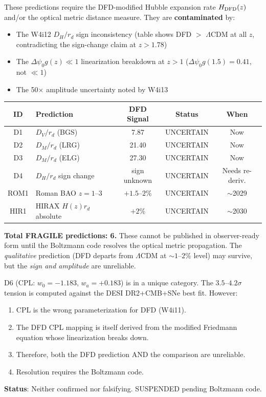 \documentclass[11pt,a4paper]{article}
\newcommand{\LCDM}{$\Lambda$CDM}
\begin{document}
\begin{fragbox}

These predictions require the DFD-modified Hubble expansion rate
$H_{\rm DFD}(z)$ and/or the optical metric distance measure. They are
\textbf{contaminated} by:
\begin{itemize}[nosep]
\item The W4i12 $D_H/r_d$ sign inconsistency (table shows DFD $>$ \LCDM{}
  at all $z$, contradicting the sign-change claim at $z > 1.78$)
\item The $\Delta\psi_0 g(z) \ll 1$ linearization breakdown at $z > 1$
  ($\Delta\psi_0 g(1.5) = 0.41$, not $\ll 1$)
\item The 50$\times$ amplitude uncertainty noted by W4i13
\end{itemize}

\begin{center}
\begin{tabular}{clccc}
\toprule
\textbf{ID} & \textbf{Prediction} & \textbf{DFD Signal}
& \textbf{Status} & \textbf{When} \\
\midrule
D1 & $D_V/r_d$ (BGS) & 7.87 & UNCERTAIN & Now \\
D2 & $D_M/r_d$ (LRG) & 21.40 & UNCERTAIN & Now \\
D3 & $D_M/r_d$ (ELG) & 27.30 & UNCERTAIN & Now \\
D4 & $D_H/r_d$ sign change & sign unknown & UNCERTAIN & Needs re-deriv. \\
ROM1 & Roman BAO $z = 1$--3 & $+1.5$--$2\%$ & UNCERTAIN & $\sim$2029 \\
HIR1 & HIRAX $H(z)r_d$ absolute & $+2\%$ & UNCERTAIN & $\sim$2030 \\
\bottomrule
\end{tabular}
\end{center}

\textbf{Total FRAGILE predictions: 6.} These cannot be published in
observer-ready form until the Boltzmann code resolves the optical metric
propagation. The \emph{qualitative} prediction (DFD departs from \LCDM{}
at $\sim 1$--$2\%$ level) may survive, but the \emph{sign and amplitude}
are unreliable.
\end{fragbox}

\begin{tensionbox}
D6 (CPL: $w_0 = -1.183$, $w_a = +0.183$) is in a unique category.
The $3.5$--$4.2\sigma$ tension is computed against the DESI DR2+CMB+SNe
best fit. However:
\begin{enumerate}[nosep]
\item CPL is the wrong parameterization for DFD (W4i11).
\item The DFD CPL mapping is itself derived from the modified Friedmann
  equation whose linearization breaks down.
\item Therefore, both the DFD prediction AND the comparison are unreliable.
\item Resolution requires the Boltzmann code.
\end{enumerate}
\textbf{Status}: Neither confirmed nor falsifying. SUSPENDED pending
Boltzmann code.
\end{tensionbox}
\end{document}
